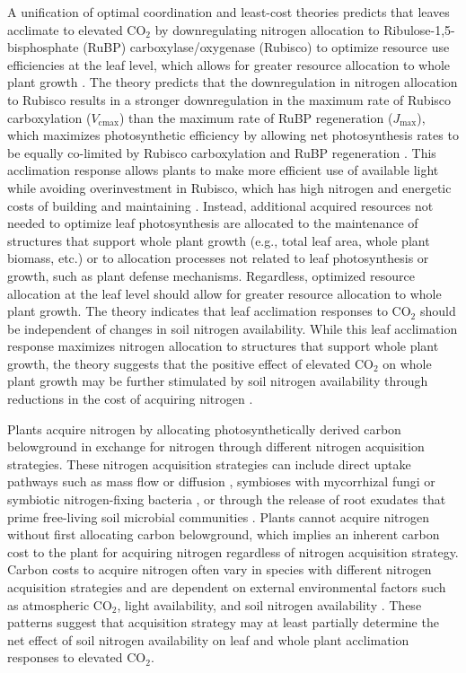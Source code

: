A unification of optimal coordination and least-cost theories predicts that leaves acclimate to elevated CO$_2$ by downregulating nitrogen allocation to Ribulose-1,5-bisphosphate (RuBP) carboxylase/oxygenase (Rubisco) to optimize resource use efficiencies at the leaf level, which allows for greater resource allocation to whole plant growth . The theory predicts that the downregulation in nitrogen allocation to Rubisco results in a stronger downregulation in the maximum rate of Rubisco carboxylation ($V_\mathrm{cmax}$) than the maximum rate of RuBP regeneration ($J_\mathrm{max}$), which maximizes photosynthetic efficiency by allowing net photosynthesis rates to be equally co-limited by Rubisco carboxylation and RuBP regeneration . This acclimation response allows plants to make more efficient use of available light while avoiding overinvestment in Rubisco, which has high nitrogen and energetic costs of building and maintaining . Instead, additional acquired resources not needed to optimize leaf photosynthesis are allocated to the maintenance of structures that support whole plant growth (e.g., total leaf area, whole plant biomass, etc.) or to allocation processes not related to leaf photosynthesis or growth, such as plant defense mechanisms. Regardless, optimized resource allocation at the leaf level should allow for greater resource allocation to whole plant growth. The theory indicates that leaf acclimation responses to CO$_2$ should be independent of changes in soil nitrogen availability. While this leaf acclimation response maximizes nitrogen allocation to structures that support whole plant growth, the theory suggests that the positive effect of elevated CO$_2$ on whole plant growth may be further stimulated by soil nitrogen availability through reductions in the cost of acquiring nitrogen .

Plants acquire nitrogen by allocating photosynthetically derived carbon belowground in exchange for nitrogen through different nitrogen acquisition strategies. These nitrogen acquisition strategies can include direct uptake pathways such as mass flow or diffusion , symbioses with mycorrhizal fungi or symbiotic nitrogen-fixing bacteria , or through the release of root exudates that prime free-living soil microbial communities . Plants cannot acquire nitrogen without first allocating carbon belowground, which implies an inherent carbon cost to the plant for acquiring nitrogen regardless of nitrogen acquisition strategy. Carbon costs to acquire nitrogen often vary in species with different nitrogen acquisition strategies and are dependent on external environmental factors such as atmospheric CO$_2$, light availability, and soil nitrogen availability . These patterns suggest that acquisition strategy may at least partially determine the net effect of soil nitrogen availability on leaf and whole plant acclimation responses to elevated CO$_2$.


